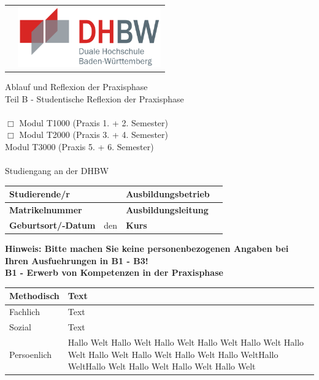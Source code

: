 	\begin{longtable}{p{} p{}}
	 & {\includegraphics[height=2.6cm]{images/dhbw.png}}
	\end{longtable}
	\enlargethispage{20mm}
	Ablauf und Reflexion der Praxisphase\\
	Teil B - Studentische Reflexion der Praxisphase\\
	\vspace*{2mm}\\
	$\Box$ Modul T1000 (Praxis 1. + 2. Semester)\\
	$\Box$ Modul T2000 (Praxis 3. + 4. Semester)\\
	\checkmark Modul T3000 (Praxis 5. + 6. Semester)\\
	\vspace*{2mm}\\
	Studiengang \studiengang an der DHBW \dhbw\\

	\begin{tabular}{|p{3.5cm}|p{4cm}|p{4cm}|p{4cm}|}
	\hline
	\textbf{Studierende/r} & \autor & \textbf{Ausbildungsbetrieb} & \ausbildungsbetrieb \\
	\hline
	\textbf{Matrikelnummer} & \matrikelnr & \textbf{Ausbildungsleitung} & \ausbildungsleitung \\
	\hline
	\textbf{Geburtsort/-Datum} & \gebort{} den \gebdatum & \textbf{Kurs} & \kurs \\
	\hline
	\end{tabular}

\textbf{Hinweis: Bitte machen Sie keine personenbezogenen Angaben bei Ihren Ausfuehrungen in B1 - B3!}\\

\textbf{B1 - Erwerb von Kompetenzen in der Praxisphase} \\
\begin{tabular}{|p{2cm}|p{12cm}|}
	\hline
	Methodisch & Text\\
	\hline
	Fachlich & Text\\
	\hline
	Sozial & Text\\
	\hline
	Persoenlich & Hallo Welt Hallo Welt Hallo Welt Hallo Welt Hallo Welt Hallo Welt Hallo Welt Hallo Welt Hallo Welt Hallo WeltHallo WeltHallo Welt Hallo Welt Hallo Welt Hallo Welt\\
	\hline
\end{tabular}

